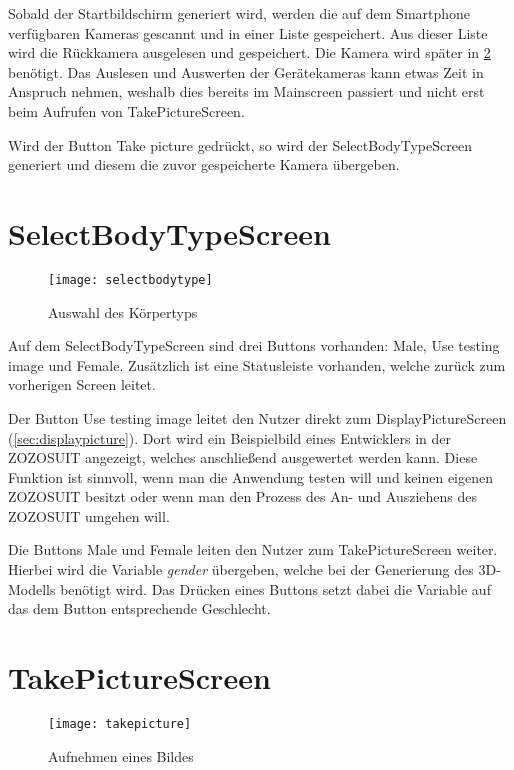 Sobald der Startbildschirm generiert wird, werden die auf dem Smartphone verfügbaren Kameras gescannt und in einer Liste gespeichert. Aus dieser Liste wird die Rückkamera 
ausgelesen und gespeichert. Die Kamera wird später in \ref{sec:takepicture} benötigt. Das Auslesen und Auswerten der Gerätekameras kann etwas Zeit in Anspruch nehmen, weshalb dies 
bereits im Mainscreen passiert und nicht erst beim Aufrufen von TakePictureScreen.

Wird der Button \glqq{}Take picture\grqq{} gedrückt, so wird der SelectBodyTypeScreen generiert und diesem die zuvor gespeicherte Kamera übergeben.

\clearpage
\section{SelectBodyTypeScreen}
\begin{figure}[htpb]
    \centering
    \texttt{[image: selectbodytype]}
    \caption{Auswahl des Körpertyps}
    \label{img:selectbodytype}
\end{figure}

Auf dem SelectBodyTypeScreen sind drei Buttons vorhanden: \glqq{}Male\grqq{}, \glqq{}Use testing image\grqq{} und \glqq{}Female\grqq{}. Zusätzlich ist eine Statusleiste vorhanden, 
welche zurück zum vorherigen Screen leitet.

Der Button \glqq{}Use testing image\grqq{} leitet den Nutzer direkt zum DisplayPictureScreen (\ref{sec:displaypicture}). Dort wird ein Beispielbild eines Entwicklers in der ZOZOSUIT 
angezeigt, welches anschließend ausgewertet werden kann. \newline
Diese Funktion ist sinnvoll, wenn man die Anwendung testen will und keinen eigenen ZOZOSUIT besitzt oder wenn man den Prozess des An- und Ausziehens des ZOZOSUIT umgehen will.

Die Buttons \glqq{}Male\grqq{} und \glqq{}Female\grqq{} leiten den Nutzer zum TakePictureScreen weiter. Hierbei wird die Variable \textit{gender} übergeben, welche bei der Generierung 
des 3D-Modells benötigt wird. Das Drücken eines Buttons setzt dabei die Variable auf das dem Button entsprechende Geschlecht.

\clearpage
\section{TakePictureScreen}
\label{sec:takepicture}
\begin{figure}[htpb]
    \centering
    \texttt{[image: takepicture]}
    \caption{Aufnehmen eines Bildes}
    \label{img:takepicture}
\end{figure}

